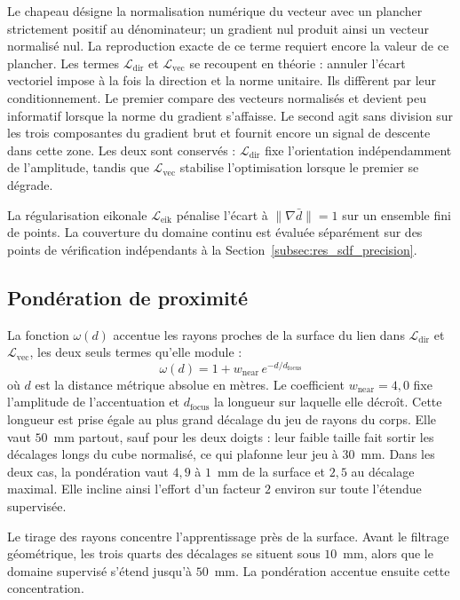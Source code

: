 Le chapeau désigne la normalisation numérique du vecteur avec un plancher strictement positif au dénominateur; un gradient nul produit ainsi un vecteur normalisé nul. La reproduction exacte de ce terme requiert encore la valeur de ce plancher. Les termes $\mathcal{L}_{\mathrm{dir}}$ et $\mathcal{L}_{\mathrm{vec}}$ se recoupent en théorie : annuler l'écart vectoriel impose à la fois la direction et la norme unitaire. Ils diffèrent par leur conditionnement. Le premier compare des vecteurs normalisés et devient peu informatif lorsque la norme du gradient s'affaisse. Le second agit sans division sur les trois composantes du gradient brut et fournit encore un signal de descente dans cette zone. Les deux sont conservés : $\mathcal{L}_{\mathrm{dir}}$ fixe l'orientation indépendamment de l'amplitude, tandis que $\mathcal{L}_{\mathrm{vec}}$ stabilise l'optimisation lorsque le premier se dégrade.

La régularisation eikonale $\mathcal{L}_{\mathrm{eik}}$ pénalise l'écart à $\|\nabla \bar{d}\|=1$ sur un ensemble fini de points. La couverture du domaine continu est évaluée séparément sur des points de vérification indépendants à la Section~\ref{subsec:res_sdf_precision}.

\subsection*{Pondération de proximité}

La fonction $\omega(d)$ accentue les rayons proches de la surface du lien dans $\mathcal{L}_{\mathrm{dir}}$ et $\mathcal{L}_{\mathrm{vec}}$, les deux seuls termes qu'elle module :
\begin{equation}\label{eq:omega_weight}
  \omega(d) = 1 + w_{\mathrm{near}}\,e^{-d/d_{\mathrm{focus}}}
\end{equation}
où $d$ est la distance métrique absolue en mètres. Le coefficient $w_{\mathrm{near}} = 4{,}0$ fixe l'amplitude de l'accentuation et $d_{\mathrm{focus}}$ la longueur sur laquelle elle décroît. Cette longueur est prise égale au plus grand décalage du jeu de rayons du corps. Elle vaut $50$~mm partout, sauf pour les deux doigts : leur faible taille fait sortir les décalages longs du cube normalisé, ce qui plafonne leur jeu à $30$~mm. Dans les deux cas, la pondération vaut $4{,}9$ à $1$~mm de la surface et $2{,}5$ au décalage maximal. Elle incline ainsi l'effort d'un facteur $2$ environ sur toute l'étendue supervisée.

Le tirage des rayons concentre l'apprentissage près de la surface. Avant le filtrage géométrique, les trois quarts des décalages se situent sous $10$~mm, alors que le domaine supervisé s'étend jusqu'à $50$~mm. La pondération accentue ensuite cette concentration.

